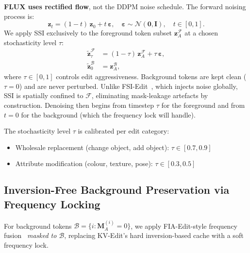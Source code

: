 \textbf{FLUX uses rectified flow}, not the DDPM noise schedule.
The forward noising process is:
\begin{equation}
    \mathbf{z}_t = (1 - t)\,\mathbf{z}_0 + t\,\boldsymbol{\varepsilon},
    \quad \boldsymbol{\varepsilon} \sim \mathcal{N}(\mathbf{0}, \mathbf{I}),
    \quad t \in [0,1].
    \label{eq:flow_noise}
\end{equation}
We apply SSI exclusively to the foreground token subset
$\mathbf{z}_A^{\mathcal{F}}$ at a chosen stochasticity level $\tau$:
\begin{align}
    \tilde{\mathbf{z}}_\tau^{\mathcal{F}}
        &= (1-\tau)\,\mathbf{z}_A^{\mathcal{F}} + \tau\,\boldsymbol{\varepsilon},
    \label{eq:ssi} \\
    \tilde{\mathbf{z}}_0^{\mathcal{B}}
        &= \mathbf{z}_A^{\mathcal{B}},
    \label{eq:bg_clean}
\end{align}
where $\tau \in [0,1]$ controls edit aggressiveness.
Background tokens are kept clean ($\tau=0$) and are never perturbed.
Unlike FSI-Edit~\cite{yang2026fsi}, which injects noise globally, SSI is spatially confined
to $\mathcal{F}$, eliminating mask-leakage artefacts by construction.
Denoising then begins from timestep $\tau$ for the foreground and from $t=0$
for the background (which the frequency lock will handle).

The stochasticity level $\tau$ is calibrated per edit category:
\begin{itemize}[nosep]
    \item Wholesale replacement (change object, add object): $\tau \in [0.7, 0.9]$
    \item Attribute modification (colour, texture, pose): $\tau \in [0.3, 0.5]$
\end{itemize}

\subsection{Inversion-Free Background Preservation via Frequency Locking}
\label{sec:bg_lock}

For background tokens $\mathcal{B} = \{i : \mathbf{M}_A^{(i)} = 0\}$, we apply
FIA-Edit-style frequency fusion~\cite{yang2026fia} \emph{masked to $\mathcal{B}$},
replacing KV-Edit's hard inversion-based cache with a soft frequency lock.

